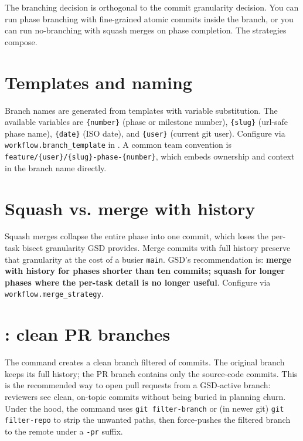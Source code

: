 \documentclass[11pt,letterpaper,openany]{book}
\begin{document}
The branching decision is orthogonal to the commit granularity decision. You can run phase branching with fine-grained atomic commits inside the branch, or you can run no-branching with squash merges on phase completion. The strategies compose.

\section{Templates and naming}

Branch names are generated from templates with variable substitution. The available variables are \texttt{\{number\}} (phase or milestone number), \texttt{\{slug\}} (url-safe phase name), \texttt{\{date\}} (ISO date), and \texttt{\{user\}} (current git user). Configure via \texttt{workflow.branch\_template} in . A common team convention is \texttt{feature/\{user\}/\{slug\}-phase-\{number\}}, which embeds ownership and context in the branch name directly.

\section{Squash vs. merge with history}

Squash merges collapse the entire phase into one commit, which loses the per-task bisect granularity GSD provides. Merge commits with full history preserve that granularity at the cost of a busier \texttt{main}. GSD's recommendation is: \textbf{merge with history for phases shorter than ten commits; squash for longer phases where the per-task detail is no longer useful}. Configure via \texttt{workflow.merge\_strategy}.

\section{: clean PR branches}

The  command creates a clean branch filtered of  commits. The original branch keeps its full history; the PR branch contains only the source-code commits. This is the recommended way to open pull requests from a GSD-active branch: reviewers see clean, on-topic commits without being buried in planning churn. Under the hood, the command uses \texttt{git filter-branch} or (in newer git) \texttt{git filter-repo} to strip the unwanted paths, then force-pushes the filtered branch to the remote under a \texttt{-pr} suffix.

\end{document}
